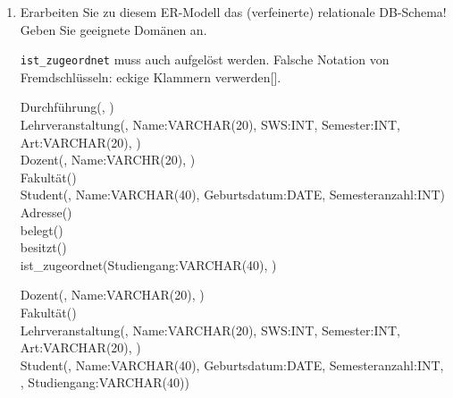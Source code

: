 \documentclass{lehramt-informatik-minimal}
\begin{document}
\renewcommand{\labelenumi}{(\alph{enumi})}
\begin{enumerate}
\item Erarbeiten Sie zu diesem ER-Modell das (verfeinerte) relationale
DB-Schema! Geben Sie geeignete
Domänen an.

\begin{antwort}[falsch]
\texttt{ist\_zugeordnet} muss auch aufgelöst
werden. Falsche Notation von Fremdschlüsseln: eckige Klammern
verwerden[].

\ttfamily
\footnotesize
Durchführung(, )\\

Lehrveranstaltung(, Name:VARCHAR(20), SWS:INT,
Semester:INT, Art:VARCHAR(20), )\\

Dozent(, Name:VARCHR(20),
)\\

Fakultät()\\

Student(, Name:VARCHAR(40), Geburtsdatum:DATE,
Semesteranzahl:INT)\\

Adresse()\\

belegt()\\

besitzt()\\

ist\_zugeordnet(Studiengang:VARCHAR(40), )\\
\end{antwort}

\begin{antwort}[muster]
\ttfamily
\footnotesize
Dozent(, Name:VARCHAR(20),
)\\

Fakultät()\\

Lehrveranstaltung(, Name:VARCHAR(20), SWS:INT,
Semester:INT, Art:VARCHAR(20), )\\

Student(, Name:VARCHAR(40), Geburtsdatum:DATE,
Semesteranzahl:INT, ,
Studiengang:VARCHAR(40))\\


\end{antwort}
\end{enumerate}
\end{document}
